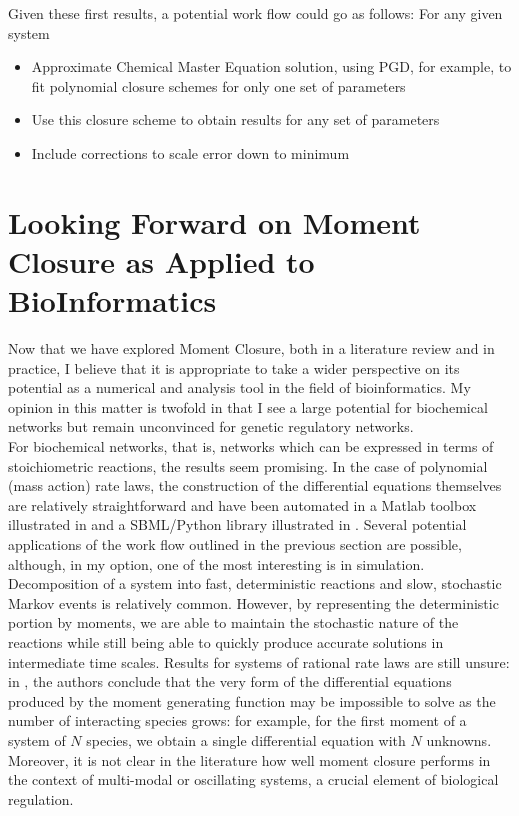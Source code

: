 \documentclass[a4paper,10pt]{article}
\begin{document}
Given these first results, a potential work flow could go as follows:
For any given system
\begin{itemize}
 \item Approximate Chemical Master Equation solution, using PGD, for example, to fit polynomial closure schemes for only one set of parameters
 \item Use this closure scheme to obtain results for any set of parameters
 \item Include corrections to scale error down to minimum
\end{itemize}

\section{Looking Forward on Moment Closure as Applied to BioInformatics}
Now that we have explored Moment Closure, both in a literature review and in practice, I believe that it is appropriate to take a wider perspective on its potential as a numerical and analysis tool in the field of bioinformatics. My opinion in this matter is twofold in that I see a large potential for biochemical networks but remain unconvinced for genetic regulatory networks. \\

For biochemical networks, that is, networks which can be expressed in terms of stoichiometric reactions, the results seem promising. In the case of polynomial (mass action) rate laws, the construction of the differential equations themselves are relatively straightforward and have been automated in a Matlab toolbox illustrated in \cite{3} and a SBML/Python library illustrated in \cite{1}. Several potential applications of the work flow outlined in the previous section are possible, although, in my option, one of the most interesting is in simulation. Decomposition of a system into fast, deterministic reactions and slow, stochastic Markov events is relatively common. However, by representing the deterministic portion by moments, we are able to maintain the stochastic nature of the reactions while still being able to quickly produce accurate solutions in intermediate time scales. Results for systems of rational rate laws are still unsure: in \cite{2}, the authors conclude that the very form of the differential equations produced by the moment generating function may be impossible to solve as the number of interacting species grows: for example, for the first moment of a system of $N$ species, we obtain a single differential equation with $N$ unknowns. Moreover, it is not clear in the literature how well moment closure performs in the context of multi-modal  or oscillating systems, a crucial element of biological regulation.\\
\end{document}
